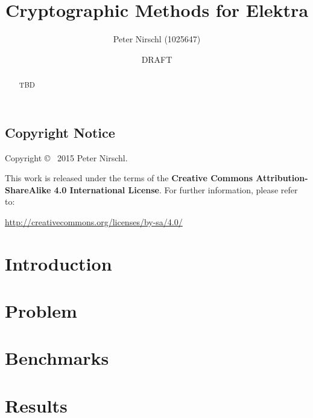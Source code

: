 \documentclass[a4paper,12pt]{report}
\title{Cryptographic Methods for Elektra}
\author{Peter Nirschl (1025647)}
\date{DRAFT}
\begin{document}
\maketitle
\begin{abstract}
TBD
\end{abstract}

\newpage
\section*{Copyright Notice}

Copyright \copyright~ 2015 Peter Nirschl.

This work is released under the terms of the \textbf{Creative Commons Attribution-ShareAlike 4.0 International License}.
For further information, please refer to:

\url{http://creativecommons.org/licenses/by-sa/4.0/}
\newpage

\setcounter{tocdepth}{2} %
\tableofcontents
\newpage


\chapter{Introduction}



\chapter{Problem}


\chapter{Benchmarks}


\chapter{Results}
\end{document}
